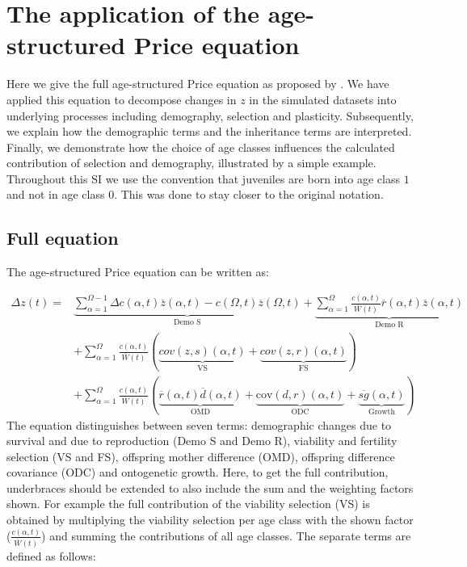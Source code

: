 \newcommand{\avav}[3]{\overline{#1}(#3)\;\overline{#2}(#3)}
\newcommand{\cov}[2]{\text{cov}(#1,#2)}
\newcommand{\ages}{\sum_{a=1}^{\Omega}}
\section{The application of the age-structured Price equation}
\label{app:ape}
Here we give the full age-structured Price equation as proposed by \cite{Coulson2008}. We have applied this equation to decompose changes in $z$ in the simulated datasets into underlying processes including demography, selection and plasticity. Subsequently, we explain how the demographic terms and the inheritance terms are interpreted. Finally, we demonstrate how the choice of age classes influences the calculated contribution of selection and demography, illustrated by a simple example. Throughout this SI we use the convention that juveniles are born into age class $1$ and not in age class $0$. This was done to stay closer to the original notation.

\subsection{Full equation}
\label{app:ape:eq}
The age-structured Price equation can be written as:

\begin{equation}
\begin{aligned}
\Delta z (t) = & \underbrace{\sum_{\alpha=1}^{\Omega-1} \Delta c(\alpha,t) \overline{z}(\alpha,t) - c(\Omega,t) \overline{z} (\Omega,t)}_{\text{Demo S}} + \underbrace{
\sum_{\alpha=1}^\Omega 
	\frac{c(\alpha,t)}
    {\overline{W}(t)} 
\overline{r}(\alpha,t)
\overline{z}(\alpha,t)}_{\text{Demo R}} \\ & 
+ \sum_{\alpha=1}^{\Omega} \frac{c(\alpha,t)}{\overline{W}(t)} \left(\underbrace{cov(z,s)(\alpha,t)}_{\text{VS}}+
\underbrace{cov(z,r)(\alpha,t)}_{\text{FS}}\right) \\ & 
 + \sum_{\alpha=1}^\Omega \frac{c(\alpha,t)}{\overline{W}(t)} \left(\underbrace{\overline{r}(\alpha,t)\overline{d}(\alpha,t)}_{\text{OMD}} + \underbrace{\mathrm{cov}(d,r)(\alpha,t)}_{\text{ODC}} +
\underbrace{\overline{sg}(\alpha,t)}_{\text{Growth}}\right) 
\end{aligned}
\label{keq1}
\end{equation}
The equation distinguishes between seven terms: demographic changes due to survival and due to reproduction (Demo S and Demo R), viability and fertility selection (VS and FS), offspring mother difference (OMD), offspring difference covariance (ODC) and ontogenetic growth. Here, to get the full contribution, underbraces should be extended to also include the sum and the weighting factors shown. For example the full contribution of the viability selection (VS) is obtained by multiplying the viability selection per age class with the shown factor ($\frac{c(\alpha,t)}{\overline{W}(t)}$) and summing the contributions of all age classes. The separate terms are defined as follows:


